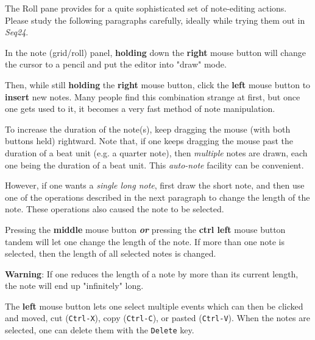    The Roll pane provides for a quite sophisticated set of note-editing
   actions.  Please study the following paragraphs carefully, ideally while
   trying them out in \textsl{Seq24}.

	In the note (grid/roll) panel, \textbf{holding}
	down the \textbf{right} mouse button will change the cursor
	to a pencil and put the editor into "draw" mode.
   
   Then, while still \textbf{holding} the \textbf{right} mouse button, click
   the \textbf{left} mouse button to \textbf{insert} new notes.  Many people
   find this combination strange at first, but once one gets used to it, it
   becomes a very fast method of note manipulation.

   To increase the duration of the note(s), keep dragging the mouse (with
   both buttons held) rightward.
   Note that, if one keeps dragging the mouse past the duration of a
   beat unit (e.g. a quarter note), then \textsl{multiple} notes are drawn,
   each one being the duration of a beat unit.  This \textsl{auto-note}
   facility can be convenient.
   
   However, if one wants a \textsl{single long note}, first draw the
   short note, and then use one of the operations described in the next
   paragraph to change the length of the note.  These operations also caused
   the note to be selected.

   Pressing the \textbf{middle} mouse button \textbf{\textsl{or}}
   pressing the \textbf{ctrl left} mouse button tandem will let one change 
	the length of the note. 
   If more than one note is selected, then the length of all selected notes
   is changed.
   
   \textbf{Warning}:  If one reduces the length of a note by more than its
   current length, the note will end up "infinitely" long.

	The \textbf{left} mouse button lets one select multiple events 
   which can then be clicked and moved,
    cut (\texttt{Ctrl-X}), 
    copy (\texttt{Ctrl-C}),
    or pasted (\texttt{Ctrl-V}).
   When the notes are selected,
   one can delete them with the \texttt{Delete} key.

